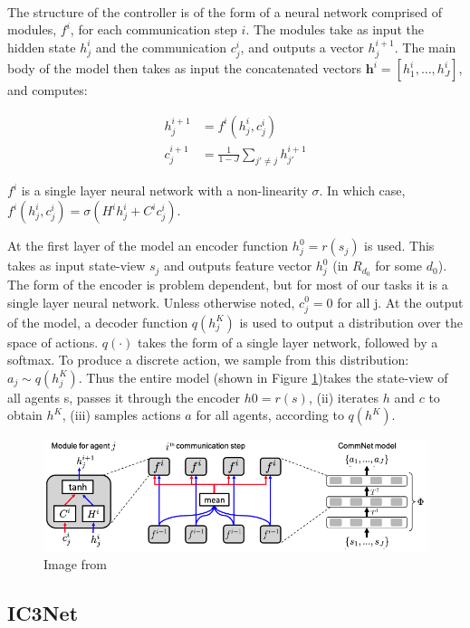 \documentclass{article}
\begin{document}
\

The structure of the controller is of the form of a neural network comprised of modules, $f^i$, for each communication step $i$. The modules take as input the hidden state $h^i_j$ and the communication $c^i_j$,  and outputs a vector $h^{i+1}_j$. The main body of the model then takes as input the concatenated vectors $\mathbf{h}^i = [h^i_1, \hdots,  h^i_J]$, and computes:

\begin{align*}
	h_j^{i+1} &= f^i(h^i_j, c^i_j) \\
	c_j^{i+1} &= \frac{1}{1 - J} \sum_{j' \neq j} h_{j'}^{i + 1}
\end{align*}

$f^i$ is a single layer neural network with a non-linearity $\sigma$. In which case, $f^i(h^i_j, c^i_j) = \sigma(H^i h^i_j +  C^i c^i_j)$. 

At the first layer of the model an encoder function $h_j^0 = r(s_j)$ is used. This takes as input state-view $s_j$ and outputs feature vector $h_j^0$ (in $R_{d_0}$ for some $d_0$). The form of the encoder is problem dependent,  but for most of our tasks it is a single layer neural network. Unless otherwise noted, $c_j^0 = 0$ for all j.  At the output of the model, a decoder function $q(h_j^K)$ is used to output a distribution over the space of  actions. $q(\cdot)$ takes the form of a single layer network, followed by a softmax. To produce a discrete  action, we sample from this distribution: $a_j \sim q(h_j^K )$.  Thus the entire model (shown in Figure \ref{fig:commnet})takes the state-view of all agents s, passes it through the encoder $h0 = r(s)$, (ii) iterates $h$ and $c$ to obtain $h^K$, (iii) samples actions $a$ for all agents, according to $q(h^K)$.

\begin{figure}
	\centering
	\includegraphics[scale=0.5]{images/commnet.png}
	\caption{Image from \citet{sukhbaatar2016commnet}}
	\label{fig:commnet}
\end{figure}

\subsection{IC3Net}
\end{document}
